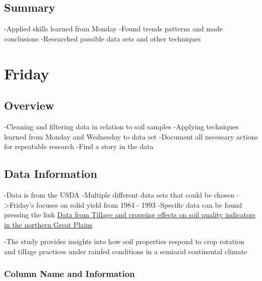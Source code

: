 \documentclass[
  letterpaper,
  DIV=11,
  numbers=noendperiod]{scrreprt}
\begin{document}
\subsection{Summary}\label{summary}

-Applied skills learned from Monday -Found trends patterns and made
conclusions -Researched possible data sets and other techniques

\section{Friday}\label{friday}

\subsection{Overview}\label{overview-1}

-Cleaning and filtering data in relation to soil samples -Applying
techniques learned from Monday and Wednesday to data set -Document all
necessary actions for repeatable research -Find a story in the data

\subsection{Data Information}\label{data-information}

-Data is from the USDA -Multiple different data sets that could be
chosen -\textgreater Friday's focuses on solid yield from 1984 - 1993
-Specific data can be found pressing the link
\href{https://agdatacommons.nal.usda.gov/articles/dataset/Data_from_Tillage_and_cropping_effects_on_soil_quality_indicators_in_the_northern_Great_Plains/26673769?file=48572716}{Data
from Tillage and cropping effects on soil quality indicators in the
northern Great Plains}

-The study provides insights into how soil properties respond to crop
rotation and tillage practices under rainfed conditions in a semiarid
continental climate

\subsubsection{Column Name and
Information}\label{column-name-and-information}
\end{document}
